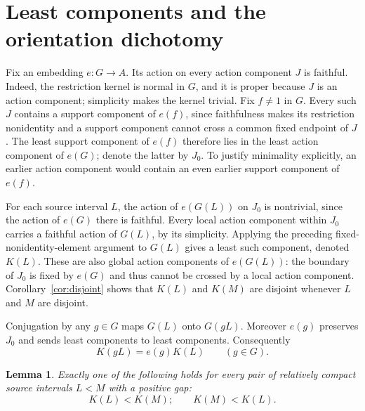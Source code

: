 \documentclass[10pt]{article}
\newtheorem{lemma}[theorem]{Lemma}
\theoremstyle{definition}
\begin{document}
\section{Least components and the orientation dichotomy}

Fix an embedding $e:G\to A$. Its action on every action component
$J$ is faithful. Indeed, the restriction kernel is normal in $G$,
and it is proper because $J$ is an action component; simplicity
makes the kernel trivial. Fix $f\ne1$ in $G$. Every such $J$ contains
a support component of $e(f)$, since faithfulness makes its restriction
nonidentity and a support component cannot cross a common fixed
endpoint of $J$. The least support component of $e(f)$ therefore lies
in the least action component of $e(G)$; denote the latter by $J_0$.
To justify minimality explicitly, an earlier action component would
contain an even earlier support component of $e(f)$.

For each source interval $L$, the action of $e(G(L))$ on $J_0$ is
nontrivial, since the action of $e(G)$ there is faithful. Every local
action component within $J_0$ carries a faithful action of $G(L)$,
by its simplicity. Applying the preceding fixed-nonidentity-element
argument to $G(L)$ gives a least such component, denoted $K(L)$.
These are also global action components of $e(G(L))$: the boundary
of $J_0$ is fixed by $e(G)$ and thus cannot be crossed by a local
action component. Corollary~\ref{cor:disjoint} shows that $K(L)$ and
$K(M)$ are disjoint whenever $L$ and $M$ are disjoint.

Conjugation by any $g\in G$ maps $G(L)$ onto $G(gL)$. Moreover
$e(g)$ preserves $J_0$ and sends least components to least components.
Consequently
\begin{equation}\label{eq:equivariant}
 K(gL)=e(g)K(L)\qquad(g\in G).
\end{equation}

\begin{lemma}\label{lem:orientation}
Exactly one of the following holds for every pair of relatively
compact source intervals $L<M$ with a positive gap:
\[
 K(L)<K(M);\qquad K(M)<K(L).
\]
\end{lemma}
\end{document}
